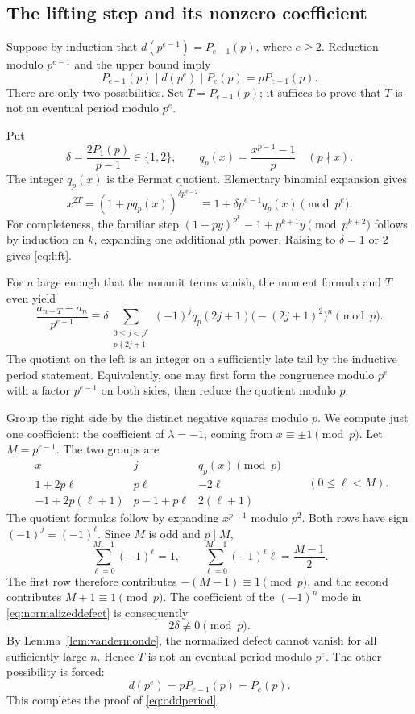 \documentclass[11pt,a4paper]{article}
\numberwithin{equation}{section}
\theoremstyle{definition}
\begin{document}
\subsection{The lifting step and its nonzero coefficient}

Suppose by induction that $d(p^{e-1})=P_{e-1}(p)$, where $e\ge2$.
Reduction modulo $p^{e-1}$ and the upper bound imply
\[
P_{e-1}(p)\mid d(p^e)\mid P_e(p)=pP_{e-1}(p).
\]
There are only two possibilities. Set $T=P_{e-1}(p)$; it suffices to
prove that $T$ is not an eventual period modulo $p^e$.

Put
\[
\delta=\frac{2P_1(p)}{p-1}\in\{1,2\},\qquad
q_p(x)=\frac{x^{p-1}-1}{p}\quad(p\nmid x).
\]
The integer $q_p(x)$ is the Fermat quotient. Elementary binomial expansion
gives
\begin{equation}\label{eq:lift}
x^{2T}=(1+pq_p(x))^{\delta p^{e-2}}
\equiv1+\delta p^{e-1}q_p(x)\pmod{p^e}.
\end{equation}
For completeness, the familiar step
$(1+py)^{p^k}\equiv1+p^{k+1}y\pmod{p^{k+2}}$
follows by induction on $k$, expanding one additional $p$th power.
Raising to $\delta=1$ or $2$ gives \eqref{eq:lift}.

For $n$ large enough that the nonunit terms vanish, the moment formula and
$T$ even yield
\begin{equation}\label{eq:normalizeddefect}
\frac{a_{n+T}-a_n}{p^{e-1}}
\equiv\delta
\sum_{\substack{0\le j<p^e\\p\nmid2j+1}}
(-1)^j q_p(2j+1)\bigl(-(2j+1)^2\bigr)^n\pmod p.
\end{equation}
The quotient on the left is an integer on a sufficiently late tail by
the inductive period statement. Equivalently, one may first form the
congruence modulo $p^e$ with a factor $p^{e-1}$ on both sides, then reduce
the quotient modulo $p$.

Group the right side by the distinct negative squares modulo $p$.
We compute just one coefficient: the coefficient of $\lambda=-1$,
coming from $x\equiv\pm1\pmod p$. Let $M=p^{e-1}$. The two groups are
\[
\begin{array}{c|c|c}
 x & j & q_p(x)\pmod p\\ \hline
 1+2p\ell & p\ell & -2\ell\\
 -1+2p(\ell+1) & p-1+p\ell & 2(\ell+1)
\end{array}
\qquad(0\le\ell<M).
\]
The quotient formulas follow by expanding $x^{p-1}$ modulo $p^2$.
Both rows have sign $(-1)^j=(-1)^\ell$. Since $M$ is odd and $p\mid M$,
\[
\sum_{\ell=0}^{M-1}(-1)^\ell=1,\qquad
\sum_{\ell=0}^{M-1}(-1)^\ell\ell=\frac{M-1}{2}.
\]
The first row therefore contributes $-(M-1)\equiv1\pmod p$, and the
second contributes $M+1\equiv1\pmod p$. The coefficient of the
$(-1)^n$ mode in \eqref{eq:normalizeddefect} is consequently
\begin{equation}\label{eq:nonzero}
2\delta\not\equiv0\pmod p.
\end{equation}
By Lemma~\ref{lem:vandermonde}, the normalized defect cannot vanish for all
sufficiently large $n$. Hence $T$ is not an eventual period modulo $p^e$.
The other possibility is forced:
\[
d(p^e)=pP_{e-1}(p)=P_e(p).
\]
This completes the proof of \eqref{eq:oddperiod}.
\end{document}
